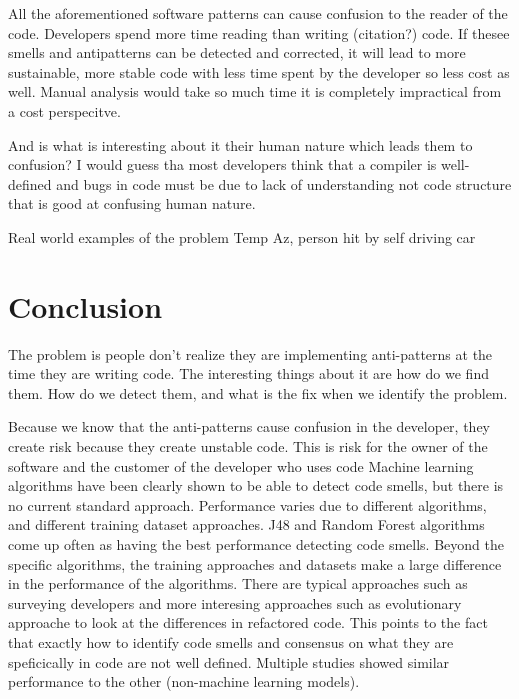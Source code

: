 \documentclass[conference]{IEEEtran}
\begin{document}
All the aforementioned software patterns can cause confusion to the reader of the code. Developers spend more time reading than writing (citation?) code. If thesee smells and antipatterns can be detected and corrected, it will lead to more sustainable, more stable code with less time spent by the developer so less cost as well.
Manual analysis would take so much time it is completely impractical from a cost perspecitve.

And is what is interesting about it their human nature which leads them to confusion?
I would guess tha most developers think that a compiler is well-defined and bugs in code must be due to lack of understanding not code structure that is good at confusing human nature.

Real world examples of the problem
Temp Az, person hit by self driving car\cite{noauthor_how_nodate}

\section{Conclusion}
The problem is people don't realize they are implementing anti-patterns at the time they are writing code.
The interesting things about it are how do we find them. 
How do we detect them, and what is the fix when we identify the problem.

Because we know that the anti-patterns cause confusion in the developer, they create risk because they create unstable code. 
This is risk for the owner of the software and the customer of the developer who uses code
Machine learning algorithms have been clearly shown to be able to detect code smells, but there is no current standard approach. 
Performance varies due to different algorithms, and different training dataset approaches. 
J48 and Random Forest algorithms come up often as having the best performance detecting code smells.
Beyond the specific algorithms, the training approaches and datasets make a large difference in the performance of the algorithms. 
There are typical approaches such as surveying developers and more interesing approaches such as evolutionary approache to look at the differences in refactored code.
This points to the fact that exactly how to identify code smells and consensus on what they are speficically in code are not well defined. Multiple studies showed similar performance to the other (non-machine learning models).
\end{document}
